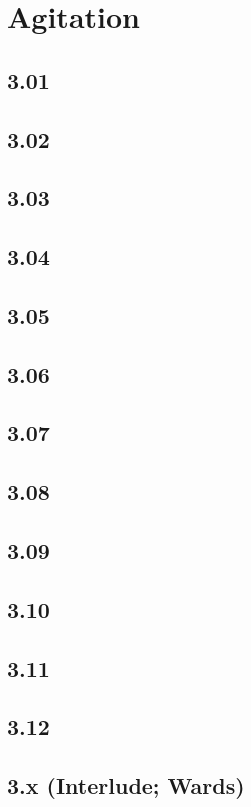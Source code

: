 \part{Agitation}
 \chapter{3.01}
 \chapter{3.02}
 \chapter{3.03}
 \chapter{3.04}
 \chapter{3.05}
 \chapter{3.06}
 \chapter{3.07}
 \chapter{3.08}
 \chapter{3.09}
 \chapter{3.10}
 \chapter{3.11}
 \chapter{3.12}
 \chapter{3.x (Interlude; Wards)}














